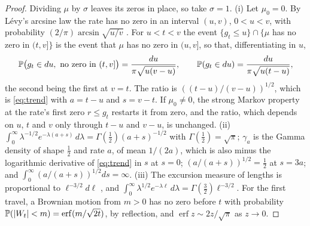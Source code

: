 \begin{proof}
Dividing $\mu$ by $\sigma$ leaves its zeros in place, so take $\sigma=1$.
(i) Let $\mu_0=0$. By L\'evy's arcsine law the rate has no zero in an
interval $(u,v)$, $0<u<v$, with probability $(2/\pi)\arcsin\sqrt{u/v}$
\cite{RY99}. For $u<t<v$ the event $\{g_t\le u\}\cap\{\mu$ has no zero in
$(t,v]\}$ is the event that $\mu$ has no zero in $(u,v]$, so that,
differentiating in $u$,
\[
\mathbb{P}\bigl(g_t\in du,\ \text{no zero in }(t,v]\bigr)=\frac{du}{\pi\sqrt{u(v-u)}},
\qquad
\mathbb{P}(g_t\in du)=\frac{du}{\pi\sqrt{u(t-u)}},
\]
the second being the first at $v=t$. The ratio is $((t-u)/(v-u))^{1/2}$,
which is \eqref{eq:trend} with $a=t-u$ and $s=v-t$. If $\mu_0\neq0$, the
strong Markov property at the rate's first zero $r\le g_t$ restarts it
from zero, and the ratio, which depends on $u$, $t$ and $v$ only through
$t-u$ and $v-u$, is unchanged. (ii)
$\int_0^\infty\lambda^{-1/2}e^{-\lambda(a+s)}\,d\lambda=\Gamma(\tfrac12)(a+s)^{-1/2}$
with $\Gamma(\tfrac12)=\sqrt\pi$; $\gamma_a$ is the Gamma density of shape
$\tfrac12$ and rate $a$, of mean $1/(2a)$, which is also minus the
logarithmic derivative of \eqref{eq:trend} in $s$ at $s=0$;
$(a/(a+s))^{1/2}=\tfrac12$ at $s=3a$; and
$\int_0^\infty(a/(a+s))^{1/2}ds=\infty$. (iii) The excursion measure of
lengths is proportional to $\ell^{-3/2}d\ell$ \cite[Ch.~XII]{RY99}, and
$\int_0^\infty\lambda^{1/2}e^{-\lambda\ell}\,d\lambda=\Gamma(\tfrac32)\ell^{-3/2}$.
For the first travel, a Brownian motion from $m>0$ has no zero before $t$
with probability $\mathbb{P}(|W_t|<m)=\operatorname{erf}(m/\sqrt{2t})$, by
reflection, and $\operatorname{erf}z\sim2z/\sqrt\pi$ as $z\to0$.
\end{proof}


